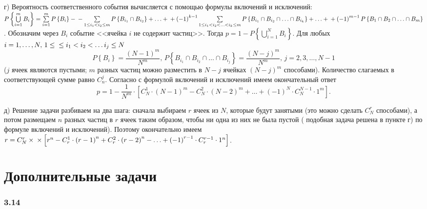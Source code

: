 \documentclass{book}
\begin{document}
г) Вероятность соответственного события вычисляется с помощью формулы включений и исключений:
$P \left\{ \bigcup \limits_{i=1}^m B_i \right\} =
\sum \limits_{i=1}^m P \left\{ B_i \right\} - \\
- \sum \limits_{1 \leq i_1 < i_2 \leq m} P \left\{ B_{i_1} \cap B_{i_2} \right\} + \dotsc + \\
+ \left( -1 \right)^{k-1} \sum \limits_{1 \leq i_1 < i_2 < \dotsc < i_k \leq m} P \left\{ B_{i_1} \cap B_{i_2} \cap \dotsc \cap B_{i_k} \right\} + \dotsc + \\
+ \left( -1 \right)^{m-1} P \left\{ B_1 \cap B_2 \cap \dotsc \cap B_m \right\}$.
Обозначим через $B_i$ событие <<ячейка $i$ не содержит частиц>>.
Тогда $p = 1 - P \left\{ \bigcup \limits_{i=1}^N B_i \right\}$.
Для любых $i = 1, \dotsc, N, \, 1 \leq \\
\leq i_1 < i_2 < \dotsc i_j \leq N$
$$P \left\{ B_i \right\} =
\frac{ \left( N-1 \right)^m}{N^m}, \,
P \left\{ B_{i_1} \cap B_{i_2} \cap \dotsc \cap B_{i_j} \right\} =
\frac{ \left( N-j \right)^m}{N^m}, \,
j = 2, 3, \dotsc, N-1$$
($j$ ячеек являются пустыми; $m$ разных частиц можно разместить в $N - j$ ячейках $ \left( N-j \right)^m$ способами).
Количество слагаемых в соответствующей сумме равно $C_n^j$.
Согласно с формулой включений и исключений имеем окончательный ответ
$$p =
1 - \frac{1}{N^m} \cdot \left[ C_N^1 \cdot \left( N-1 \right)^m - C_N^2 \cdot \left( N-2 \right)^m + \dotsc + \left( -1 \right)^N \cdot C_N^{N-1} \cdot 1^m \right].$$

д) Решение задачи разбиваем на два шага: сначала выбираем $r$ ячеек из $N$, которые будут занятыми (это можно сделать $C_N^r$ способами),
а потом размещаем $n$ разных частиц в $r$ ячеек таким образом, чтобы ни одна из них не была пустой ( подобная задача решена в пункте г) по формуле включений и исключений).
Поэтому окончательно имеем
$r =
C_N^r \times \\
\times \left[ r^n - C_r^1 \cdot \left( r-1 \right)^n + C_r^2 \cdot \left( r-2 \right)^n - \dotsc + \left( -1 \right)^{r-1} \cdot C_r^{r-1} \cdot 1^n \right]$.

\section*{Дополнительные задачи}

\subsubsection*{3.14}
\end{document}
